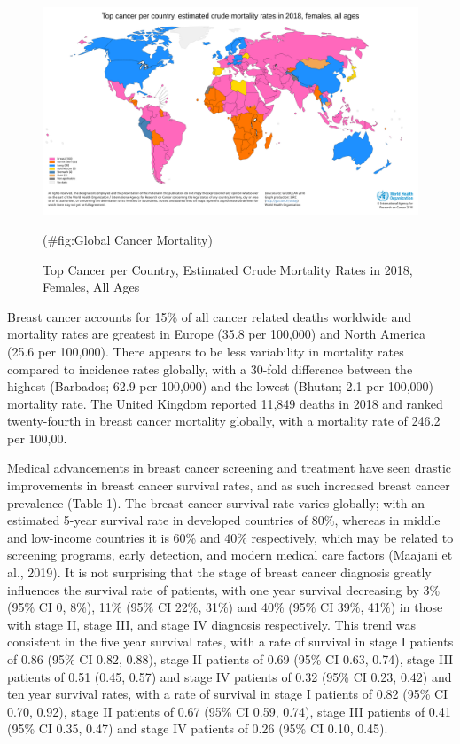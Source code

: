 \documentclass[a4paper, twoside]{templates/ociamthesis}
\begin{document}
\begin{figure}

{\centering \includegraphics[width=0.8\linewidth]{figures/Global Mortality} 

}

\caption{Top Cancer per Country, Estimated Crude Mortality Rates in 2018, Females, All Ages}(\#fig:Global Cancer Mortality)
\end{figure}

Breast cancer accounts for 15\% of all cancer related deaths worldwide and mortality rates are greatest in Europe (35.8 per 100,000) and North America (25.6 per 100,000). There appears to be less variability in mortality rates compared to incidence rates globally, with a 30-fold difference between the highest (Barbados; 62.9 per 100,000) and the lowest (Bhutan; 2.1 per 100,000) mortality rate. The United Kingdom reported 11,849 deaths in 2018 and ranked twenty-fourth in breast cancer mortality globally, with a mortality rate of 246.2 per 100,00.

Medical advancements in breast cancer screening and treatment have seen drastic improvements in breast cancer survival rates, and as such increased breast cancer prevalence (Table 1). The breast cancer survival rate varies globally; with an estimated 5-year survival rate in developed countries of 80\%, whereas in middle and low-income countries it is 60\% and 40\% respectively, which may be related to screening programs, early detection, and modern medical care factors (Maajani et al., 2019).
It is not surprising that the stage of breast cancer diagnosis greatly influences the survival rate of patients, with one year survival decreasing by 3\% (95\% CI 0, 8\%), 11\% (95\% CI 22\%, 31\%) and 40\% (95\% CI 39\%, 41\%) in those with stage II, stage III, and stage IV diagnosis respectively. This trend was consistent in the five year survival rates, with a rate of survival in stage I patients of 0.86 (95\% CI 0.82, 0.88), stage II patients of 0.69 (95\% CI 0.63, 0.74), stage III patients of 0.51 (0.45, 0.57) and stage IV patients of 0.32 (95\% CI 0.23, 0.42) and ten year survival rates, with a rate of survival in stage I patients of 0.82 (95\% CI 0.70, 0.92), stage II patients of 0.67 (95\% CI 0.59, 0.74), stage III patients of 0.41 (95\% CI 0.35, 0.47) and stage IV patients of 0.26 (95\% CI 0.10, 0.45).
\end{document}
